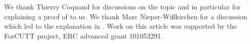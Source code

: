 We thank Thierry Coquand for discussions on the topic and in particular for explaining a proof of  to us.
We thank Marc Nieper-Wißkirchen for a discussion which led to the explanation in .
Work on this article was supported by the ForCUTT project, ERC advanced grant 101053291.